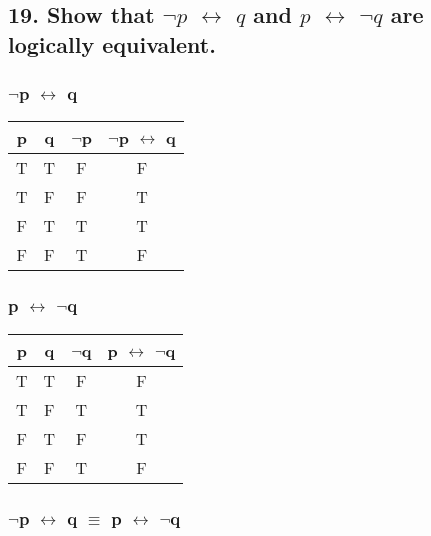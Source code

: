 \documentclass[11pt, oneside]{article} %
\numberwithin{equation}{section} %
\numberwithin{figure}{section} %
\numberwithin{table}{section} %
\begin{document}
\begin{table}[!htbp]
\subsection{19. Show that $\neg$$p$ $\leftrightarrow$ $q$ and $p$ $\leftrightarrow$ $\neg$$q$ are logically equivalent.}
\subsubsection{$\neg$p $\leftrightarrow$ q}
\begin{tabular}{c c c c}
\hline\hline
p & q & $\neg$p & $\neg$p $\leftrightarrow$ q \\ [0.5ex] 
\hline
T & T & F & F\\
T & F & F & T\\
F & T & T & T\\
F & F & T & F\\ [1ex]
\hline
\end{tabular}
\label{table:nonlin}
\end{table}

\begin{table}[!htbp]
\subsubsection{p $\leftrightarrow$ $\neg$q}
\begin{tabular}{c c c c}
\hline\hline
p & q & $\neg$q & p $\leftrightarrow$ $\neg$q \\ [0.5ex] 
\hline
T & T & F & F\\
T & F & T & T\\
F & T & F & T\\
F & F & T & F\\ [1ex]
\hline
\end{tabular}
\label{table:nonlin}
\subsubsection{$\neg$p $\leftrightarrow$ q $\equiv$ p $\leftrightarrow$ $\neg$q}
\end{table}
\end{document}
